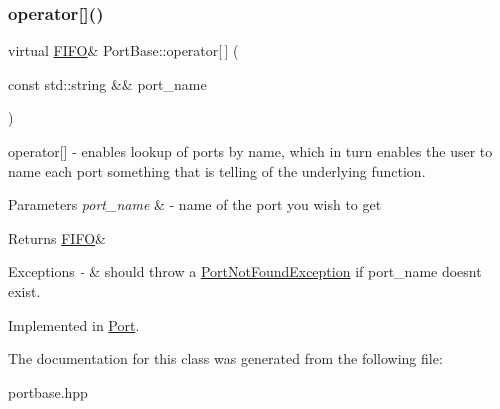 \subsubsection{\texorpdfstring{operator[]()}{operator[]()}}
{\footnotesize\ttfamily virtual \hyperlink{class_f_i_f_o}{F\+I\+FO}\& Port\+Base\+::operator\mbox{[}$\,$\mbox{]} (\begin{DoxyParamCaption}\item[{const std\+::string \&\&}]{port\+\_\+name }\end{DoxyParamCaption})\hspace{0.3cm}{\ttfamily [pure virtual]}}

operator\mbox{[}\mbox{]} -\/ enables lookup of ports by name, which in turn enables the user to name each port something that is telling of the underlying function. 
\begin{DoxyParams}{Parameters}
{\em port\+\_\+name} & -\/ name of the port you wish to get \\
\hline
\end{DoxyParams}
\begin{DoxyReturn}{Returns}
\hyperlink{class_f_i_f_o}{F\+I\+FO}\& 
\end{DoxyReturn}

\begin{DoxyExceptions}{Exceptions}
{\em -\/} & should throw a \hyperlink{class_port_not_found_exception}{Port\+Not\+Found\+Exception} if port\+\_\+name doesn\textquotesingle{}t exist. \\
\hline
\end{DoxyExceptions}


Implemented in \hyperlink{class_port_a08cf165426982d83e5a191ba74cc6e5d}{Port}.



The documentation for this class was generated from the following file\+:\begin{DoxyCompactItemize}
\item 
portbase.\+hpp\end{DoxyCompactItemize}

